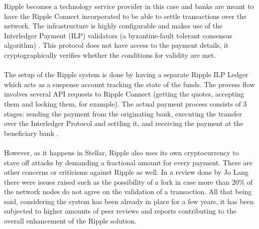 \documentclass[12pt,twoside]{article}
\begin{document}
Ripple becomes a technology service provider in this case and banks are meant to have the Ripple Connect incorporated to be able to settle transactions over the network. The infrastructure is highly configurable and makes use of the Interledger Payment (ILP) validators (a byzantine-fault tolerant consensus algorithm) \cite{Ripple:ILP} \cite{Ripple:CP}. This protocol does not have access to the payment details, it cryptographically verifies whether the conditions for validity are met. 
\\ \\
The setup of the Ripple system is done by having a separate Ripple ILP Ledger which acts as a suspense account tracking the state of the funds. The process flow involves several API requests to Ripple Connect (getting the quotes, accepting them and locking them, for example). The actual payment process consists of 3 stages: sending the payment from the originating bank, executing the transfer over the Interledger Protocol and settling it, and receiving the payment at the beneficiary bank \cite{Ripple:TP}.
\\ \\
However, as it happens in Stellar, Ripple also uses its own cryptocurrency to stave off attacks by demanding a fractional amount for every payment. There are other concerns or criticisms against Ripple as well. In a review done by Jo Lang \cite{JoLang} there were issues raised such as the possibility of a fork in case more than 20\% of the network nodes do not agree on the validation of a transaction. All that being said, considering the system has been already in place for a few years, it has been subjected to higher amounts of peer reviews and reports contributing to the overall enhancement of the Ripple solution.
\end{document}

